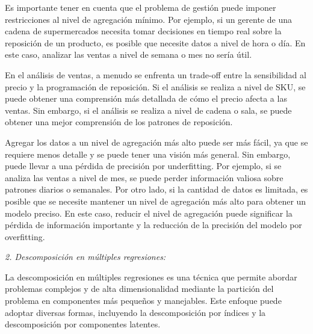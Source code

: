 \documentclass[
]{book}
\begin{document}
Es importante tener en cuenta que el problema de gestión puede imponer
restricciones al nivel de agregación mínimo. Por ejemplo, si un gerente
de una cadena de supermercados necesita tomar decisiones en tiempo real
sobre la reposición de un producto, es posible que necesite datos a
nivel de hora o día. En este caso, analizar las ventas a nivel de semana
o mes no sería útil.

En el análisis de ventas, a menudo se enfrenta un trade-off entre la
sensibilidad al precio y la programación de reposición. Si el análisis
se realiza a nivel de SKU, se puede obtener una comprensión más
detallada de cómo el precio afecta a las ventas. Sin embargo, si el
análisis se realiza a nivel de cadena o sala, se puede obtener una mejor
comprensión de los patrones de reposición.

Agregar los datos a un nivel de agregación más alto puede ser más fácil,
ya que se requiere menos detalle y se puede tener una visión más
general. Sin embargo, puede llevar a una pérdida de precisión por
underfitting. Por ejemplo, si se analiza las ventas a nivel de mes, se
puede perder información valiosa sobre patrones diarios o semanales. Por
otro lado, si la cantidad de datos es limitada, es posible que se
necesite mantener un nivel de agregación más alto para obtener un modelo
preciso. En este caso, reducir el nivel de agregación puede significar
la pérdida de información importante y la reducción de la precisión del
modelo por overfitting.

\emph{2. Descomposición en múltiples regresiones:}

La descomposición en múltiples regresiones es una técnica que permite
abordar problemas complejos y de alta dimensionalidad mediante la
partición del problema en componentes más pequeños y manejables. Este
enfoque puede adoptar diversas formas, incluyendo la descomposición por
índices y la descomposición por componentes latentes.
\end{document}
